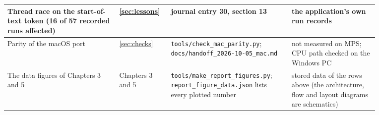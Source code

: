 \documentclass[12pt,a4paper]{report}
\begin{document}
{\begin{longtable}{|>{\raggedright\arraybackslash}p{0.277\linewidth}|>{\raggedright\arraybackslash}p{0.090\linewidth}|>{\raggedright\arraybackslash}p{0.294\linewidth}|>{\raggedright\arraybackslash}p{0.212\linewidth}|}
Thread race on the start-of-text token (16 of 57 recorded runs affected) & \ref{sec:lessons} & journal entry 30, section 13 & the application's own run records \\ \hline
Parity of the macOS port & \ref{sec:checks} & \texttt{tools/\allowbreak{}check\_\allowbreak{}mac\_\allowbreak{}parity.\allowbreak{}py}; \texttt{docs/\allowbreak{}handoff\_\allowbreak{}2026-10-05\_\allowbreak{}mac.\allowbreak{}md} & not measured on MPS; CPU path checked on the Windows PC \\ \hline
The data figures of Chapters 3 and 5 & Chapters 3 and 5 & \texttt{tools/\allowbreak{}make\_\allowbreak{}report\_\allowbreak{}figures.\allowbreak{}py}; \texttt{report\_\allowbreak{}figure\_\allowbreak{}data.\allowbreak{}json} lists every plotted number & stored data of the rows above (the architecture, flow and layout diagrams are schematics) \\ \hline
\end{longtable}}
\end{document}
